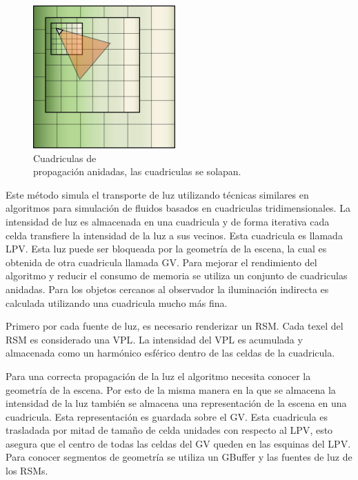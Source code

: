 \begin{figure}
	\centering
	\includegraphics[width=0.90\linewidth]{media/g4957.png}
	\caption{Cuadriculas de \\ propagación anidadas, las cuadriculas se solapan.}
	\label{fig:nested_lpv}
\end{figure}
Este método simula el transporte de luz utilizando técnicas similares en algoritmos para simulación de fluidos basados en cuadriculas \cite{Crane07} tridimensionales. La intensidad de luz es almacenada en una cuadricula y de forma iterativa cada celda transfiere la intensidad de la luz a sus vecinos. Esta cuadricula es llamada \ac{LPV}. Esta luz puede ser bloqueada por la geometría de la escena, la cual es obtenida de otra cuadricula llamada \ac{GV}. Para mejorar el rendimiento del algoritmo y reducir el consumo de memoria se utiliza un conjunto de cuadriculas anidadas. Para los objetos cercanos al observador la iluminación indirecta es calculada utilizando una cuadricula mucho más fina.

Primero por cada fuente de luz, es necesario renderizar un \ac{RSM}. Cada texel del \ac{RSM} es considerado una \ac{VPL}. La intensidad del \ac{VPL} es acumulada y almacenada como un harmónico esférico dentro de las celdas de la cuadricula.

Para una correcta propagación de la luz el algoritmo necesita conocer la geometría de la escena. Por esto de la misma manera en la que se almacena la intensidad de la luz también se almacena una representación de la escena en una cuadricula. Esta representación es guardada sobre el \ac{GV}. Esta cuadricula es trasladada por mitad de tamaño de celda unidades con respecto al \ac{LPV}, esto asegura que el centro de todas las celdas del \ac{GV} queden en las esquinas del \ac{LPV}. Para conocer segmentos de geometría se utiliza un \ac{GBuffer} y las fuentes de luz de los \ac{RSM}s.


